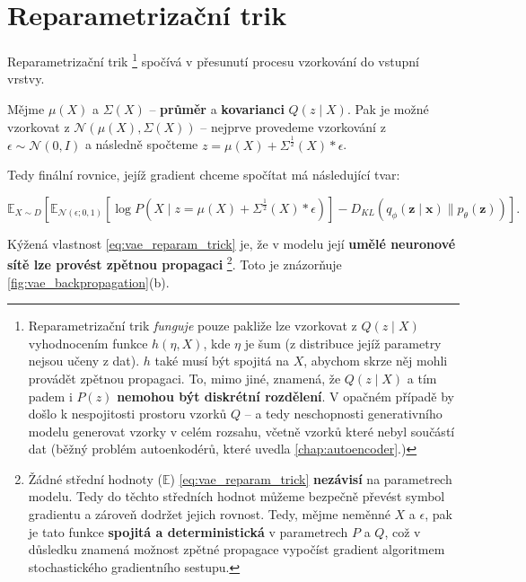 \section{Reparametrizační trik}
\label{sec:reparametrization_trick}
Reparametrizační trik
\footnote{Reparametrizační trik \emph{funguje} pouze pakliže lze vzorkovat z $Q(z\mid X)$ vyhodnocením funkce $h(\eta, X)$, kde $\eta$ je šum (z distribuce jejíž parametry nejsou učeny z dat). $h$ také musí být spojitá na $X$, abychom skrze něj mohli provádět zpětnou propagaci.
To, mimo jiné, znamená, že $Q(z\mid X)$ a tím padem i $P(z)$ \textbf{nemohou být diskrétní rozdělení}. V opačném případě by došlo k nespojitosti prostoru vzorků $Q$ – a tedy neschopnosti generativního modelu generovat vzorky v celém rozsahu, včetně vzorků které nebyl součástí dat (běžný problém autoenkodérů, které uvedla \autoref{chap:autoencoder}.)}
spočívá v přesunutí procesu vzorkování do vstupní vrstvy. \cite{Doersch2021}

Mějme $\mu(X)$ a $\Sigma(X)$ – \textbf{průměr} a \textbf{kovarianci} $Q(z\mid X)$.
Pak je možné vzorkovat z $\mathcal{N}(\mu(X), \Sigma(X))$ – nejprve provedeme vzorkování z $\epsilon \sim \mathcal{N}(0, I)$ a následně spočteme $z = \mu(X) + \Sigma^{\frac{1}{2}}(X) * \epsilon$. \cite{Doersch2021}

Tedy finální rovnice, jejíž gradient chceme spočítat má následující tvar:

\begin{equation} \label{eq:vae_reparam_trick}
    \mathds{E}_{X \sim D} \left[ \mathds{E}_{\mathcal{N}(\epsilon; 0, 1)} \left[ \log P(X\mid z = \mu(X) + \Sigma^{\frac{1}{2}} (X) * \epsilon) \right] -  D_{KL}(q_\phi(\textbf{z}\mid\textbf{x})\parallel p_\theta(\textbf{z})) \right].
\end{equation}


Kýžená vlastnost \autoref{eq:vae_reparam_trick} je, že v modelu její \textbf{umělé neuronové sítě lze provést zpětnou propagaci}
\footnote{Žádné střední hodnoty ($\mathds{E}$) \autoref{eq:vae_reparam_trick} \textbf{nezávisí} na parametrech modelu. Tedy do těchto středních hodnot můžeme bezpečně převést symbol gradientu a zároveň dodržet jejich rovnost. 
Tedy, mějme neměnné $X$ a $\epsilon$, pak je tato funkce \textbf{spojitá a deterministická} v parametrech $P$ a $Q$, což v důsledku znamená možnost zpětné propagace vypočíst gradient algoritmem stochastického gradientního sestupu.}. 
Toto je znázorňuje \autoref{fig:vae_backpropagation}(b). \cite{Kingma2014}
